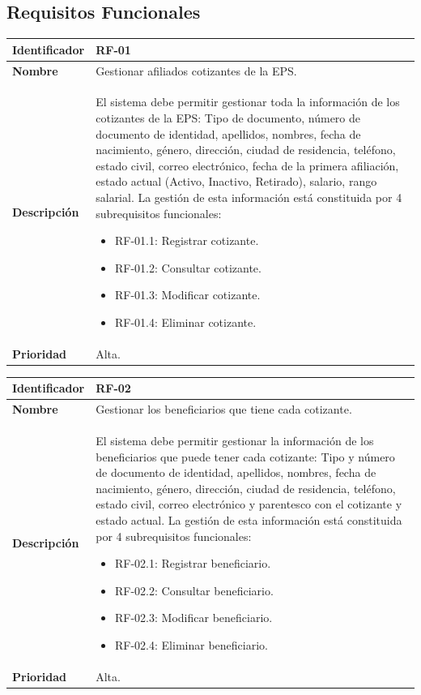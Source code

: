 \documentclass[12pt,a4paper]{article}
\begin{document}
\subsection{Requisitos Funcionales}
\begin{center}
\begin{tabular}{|m{5.5cm}|m{9.5cm}|}
\hline
\textbf{Identificador} & RF-01\\
\hline
\textbf{Nombre} & Gestionar afiliados cotizantes de la EPS.\\
\hline
\textbf{Descripción} & El sistema debe permitir gestionar toda la información de los cotizantes de la EPS: Tipo de documento, número de documento de identidad, apellidos, nombres, fecha de nacimiento, género, dirección, ciudad de residencia, teléfono, estado civil, correo electrónico, fecha de la primera afiliación, estado actual (Activo, Inactivo, Retirado), salario, rango salarial. La gestión de esta información está constituida por 4 subrequisitos funcionales:
\begin{itemize}
\item RF-01.1: Registrar cotizante.
\item RF-01.2: Consultar cotizante.
\item RF-01.3: Modificar cotizante.
\item RF-01.4: Eliminar cotizante.
\end{itemize}\\
\hline
\textbf{Prioridad} & Alta.\\
\hline
\end{tabular}
\vspace{5mm}

\begin{tabular}{|m{5.5cm}|m{9.5cm}|}
\hline
\textbf{Identificador} & RF-02\\
\hline
\textbf{Nombre} & Gestionar los beneficiarios que tiene cada cotizante.\\
\hline
\textbf{Descripción} & El sistema debe permitir gestionar la información de los  beneficiarios que puede tener cada cotizante: Tipo y número de documento de identidad, apellidos, nombres, fecha de nacimiento, género, dirección, ciudad de residencia, teléfono, estado civil, correo electrónico y parentesco con el cotizante y estado actual. La gestión de esta información está constituida por 4 subrequisitos funcionales:
\begin{itemize}
\item RF-02.1: Registrar beneficiario.
\item RF-02.2: Consultar beneficiario.
\item RF-02.3: Modificar beneficiario.
\item RF-02.4: Eliminar beneficiario.
\end{itemize}\\
\hline
\textbf{Prioridad} & Alta.\\
\hline
\end{tabular}
\vspace{5mm}


\end{center}
\end{document}
